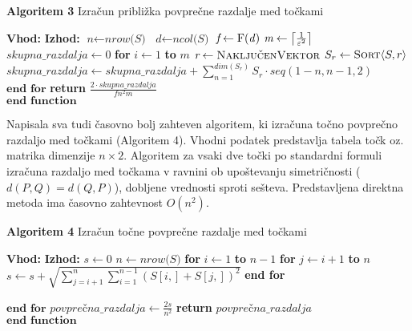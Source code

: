 \documentclass[12pt,a4paper]{amsart}
\theoremstyle{definition} %
\theoremstyle{plain} %
\DeclarePairedDelimiter\ceil{\lceil}{\rceil}
\begin{document}
\begin{algorithm}[H]
\caption{\textbf{Algoritem 3} Izračun približka povprečne razdalje med točkami}\label{priblizek}
\begin{algorithmic}[1]
\Statex\textbf{Vhod:}  
\Statex\textbf{Izhod:} 
\State $\textit{n} \gets \textit{nrow(S)}$
\State $\textit{d} \gets \textit{ncol(S)}$
\State $\textit{f} \gets \text{F(\textit{d})}$
\State $\textit{m} \gets \ceil*{\frac{1}{\varepsilon^2}}$
\State $\textit{skupna\_razdalja} \gets 0$
\State \textbf{for} $\textit{i} \gets 1$ \textbf{to} $\textit{m}$
	\State \hspace{6mm} $\textit{r} \gets \textproc{NaključenVektor}$
	\State\hspace{6mm} $S_{r} \gets \textproc{Sort} \langle S, r\rangle$ 
	\State \hspace{6mm}$\textit{skupna\_razdalja} \gets \textit{skupna\_razdalja} + \sum\limits_{n=1}^{dim(S_r)} S_{r} \cdot \textit{seq}(1-n,n-1,2)$ 
\State $\textbf{end for}$
\State \textbf{return} $\frac{2 \cdot \textit{skupna\_razdalja}}{fn^2m}$ \\
$\textbf{end function}$
\EndFunction 
\end{algorithmic}
\end{algorithm}

Napisala sva tudi časovno bolj zahteven algoritem, ki izračuna točno povprečno razdaljo med točkami (Algoritem 4). Vhodni podatek predstavlja tabela točk oz. matrika dimenzije $n \times 2$. Algoritem za vsaki dve točki po standardni formuli izračuna razdaljo med točkama v ravnini ob upoštevanju simetričnosti ($d(P,Q) = d(Q,P)$), dobljene vrednosti sproti sešteva. Predstavljena direktna metoda ima časovno zahtevnost $O(n^2)$. 

\begin{algorithm}[H]
\caption{\textbf{Algoritem 4} Izračun točne povprečne razdalje med točkami}\label{tocna}
\begin{algorithmic}[1]
\Statex\textbf{Vhod:} 
\Statex\textbf{Izhod:} 
\State $\textit{s} \gets 0$
\State $n \gets \textit{nrow(S)}$
\State \textbf{for} $\textit{i} \gets 1$ \textbf{to} $\textit{n} - 1$
	\State \hspace{6mm} \textbf{for} $\textit{j} \gets i +1 $ \textbf{to} $\textit{n}$
		\State \hspace{12mm} $\textit{s} \gets \textit{s} + \sqrt{ \sum\limits_{j=i+1}^{n} \sum\limits_{i=1}^{n-1} (S[i,]+S[j,])^2}$
 \State \hspace{6mm}	 \textbf{end for}

\State $\textbf{end for}$
\State $\textit{povprečna\_razdalja} \gets \frac{2s}{n^2}$
\State \textbf{return} $\textit{povprečna\_razdalja}$ \\
$\textbf{end function}$
\EndFunction
\end{algorithmic}
\end{algorithm}
\end{document}
